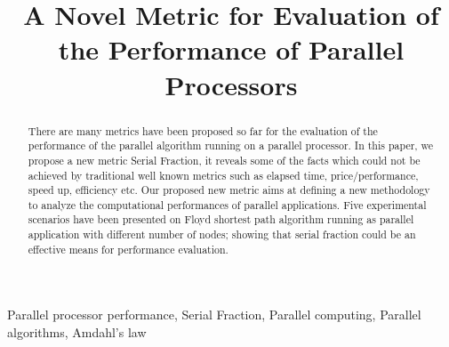 \documentclass[11pt, conference, compsocconf]{IEEEtran}
\begin{document}
\title{A Novel Metric for Evaluation of the Performance of Parallel Processors}

\author{


}

\maketitle
\thispagestyle{plain}
\pagestyle{plain}

\begin{abstract}
There are many metrics have been proposed so far for the evaluation of the performance of the parallel algorithm running on a parallel processor. In this paper, we propose a new metric Serial Fraction, it reveals some of the facts which could not be achieved by traditional well known metrics such as elapsed time, price/performance, speed up, efficiency etc. Our proposed new metric aims at defining a new methodology to analyze the computational performances of parallel applications. Five experimental scenarios have been presented on Floyd shortest path algorithm running as parallel application with different number of nodes; showing that serial fraction could be an effective means for performance evaluation.


\end{abstract}

\begin{IEEEkeywords}
Parallel processor performance, Serial Fraction, Parallel computing, Parallel algorithms, Amdahl's law

\end{IEEEkeywords}


%
\IEEEpeerreviewmaketitle



%
%
%




\end{document}
